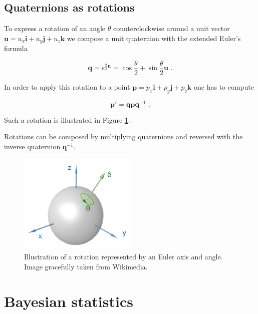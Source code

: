\subsection{Quaternions as rotations}

To express a rotation of an angle $\theta$ counterclockwise around a unit vector $\bm{u} = u_x \bm{i} + u_y \bm{j} + u_z \bm{k}$ we compose a unit quaternion with the extended Euler's formula

\begin{equation}
\label{eq:euler_ext}
    \bm{q} = e^{{\frac{\theta}{2}}{\bm{u}}} = \cos{\frac{\theta}{2}} + \sin{\frac{\theta}{2} \bm{u}} \textrm{ .}
\end{equation}

In order to apply this rotation to a point $\bm{p} = p_x \bm{i} + p_y \bm{j} + p_z \bm{k}$ one has to compute

\begin{equation}
\label{eq:quaternion_rotation}
    \bm{p}' = \bm{q} \bm{p} \bm{q}^{-1} \textrm{ .}
\end{equation}

Such a rotation is illustrated in Figure \ref{fig:quaternion_rot}.

Rotations can be composed by multiplying quaternions and reversed with the inverse quaternion $\bm{q}^{-1}$.

\begin{figure}[hbt!]
    \centering
    \includegraphics[width=0.5\textwidth]{figures/quaternion_rot.png}
    \caption{Illustration of a rotation represented by an Euler axis and angle. Image gracefully taken from Wikimedia.\cite{wikimedia_euleraxisangle_image}}
    \label{fig:quaternion_rot}
\end{figure}

\section{Bayesian statistics}
\label{sec:bayes}


